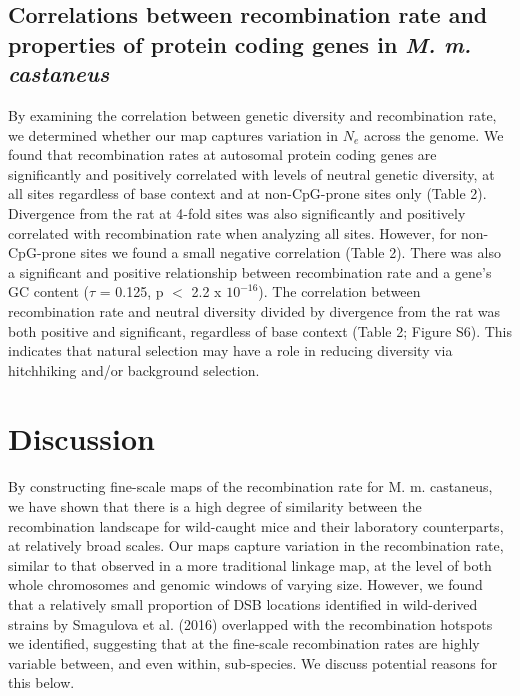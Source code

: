 \subsection{Correlations between recombination rate and properties of protein coding genes in \emph{M. m. castaneus}}

	By examining the correlation between genetic diversity and recombination rate, we determined whether our map captures variation in $N_e$ across the genome. We found that recombination rates at autosomal protein coding genes are significantly and positively correlated with levels of neutral genetic diversity, at all sites regardless of base context and at non-CpG-prone sites only (Table 2). Divergence from the rat at 4-fold sites was also significantly and positively correlated with recombination rate when analyzing all sites. However, for non-CpG-prone sites we found a small negative correlation (Table 2). There was also a significant and positive relationship between recombination rate and a gene’s GC content ($\tau$ = 0.125, p $<$ 2.2 x $10^{-16}$). The correlation between recombination rate and neutral diversity divided by divergence from the rat was both positive and significant, regardless of base context (Table 2; Figure S6). This indicates that natural selection may have a role in reducing diversity via hitchhiking and/or background selection.

\linespread{1}

\linespread{2}

\section{Discussion}
 
        	By constructing fine-scale maps of the recombination rate for M. m. castaneus, we have shown that there is a high degree of similarity between the recombination landscape for wild-caught mice and their laboratory counterparts, at relatively broad scales. Our maps capture variation in the recombination rate, similar to that observed in a more traditional linkage map, at the level of both whole chromosomes and genomic windows of varying size. However, we found that a relatively small proportion of DSB locations identified in wild-derived strains by Smagulova et al. (2016) overlapped with the recombination hotspots we identified, suggesting that at the fine-scale recombination rates are highly variable between, and even within, sub-species. We discuss potential reasons for this below.
 
